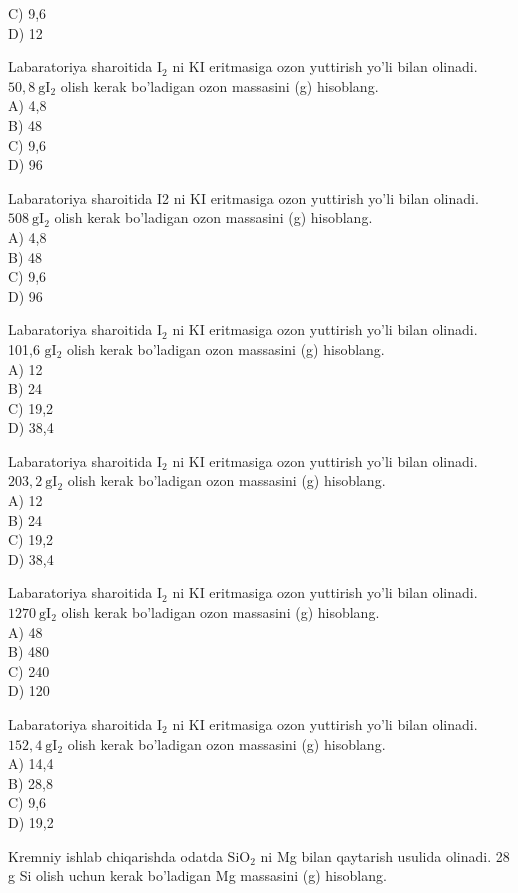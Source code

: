 C) 9,6\\
D) 12
  \item Labaratoriya sharoitida $\mathrm{I}_{2}$ ni KI eritmasiga ozon yuttirish yo'li bilan olinadi. $50,8 \mathrm{~g} \mathrm{I}_{2}$ olish kerak bo'ladigan ozon massasini (g) hisoblang.\\
A) 4,8\\
B) 48\\
C) 9,6\\
D) 96
  \item Labaratoriya sharoitida I2 ni KI eritmasiga ozon yuttirish yo'li bilan olinadi. $508 \mathrm{~g} \mathrm{I}_{2}$ olish kerak bo'ladigan ozon massasini (g) hisoblang.\\
A) 4,8\\
B) 48\\
C) 9,6\\
D) 96
  \item Labaratoriya sharoitida $\mathrm{I}_{2}$ ni KI eritmasiga ozon yuttirish yo'li bilan olinadi. 101,6 $\mathrm{g} \mathrm{I}_{2}$ olish kerak bo'ladigan ozon massasini (g) hisoblang.\\
A) 12\\
B) 24\\
C) 19,2\\
D) 38,4
  \item Labaratoriya sharoitida $\mathrm{I}_{2}$ ni KI eritmasiga ozon yuttirish yo'li bilan olinadi. $203,2 \mathrm{~g} \mathrm{I}_{2}$ olish kerak bo'ladigan ozon massasini (g) hisoblang.\\
A) 12\\
B) 24\\
C) 19,2\\
D) 38,4
  \item Labaratoriya sharoitida $\mathrm{I}_{2}$ ni KI eritmasiga ozon yuttirish yo'li bilan olinadi. $1270 \mathrm{~g} \mathrm{I}_{2}$ olish kerak bo'ladigan ozon massasini (g) hisoblang.\\
A) 48\\
B) 480\\
C) 240\\
D) 120
  \item Labaratoriya sharoitida $\mathrm{I}_{2}$ ni KI eritmasiga ozon yuttirish yo'li bilan olinadi. $152,4 \mathrm{~g} \mathrm{I}_{2}$ olish kerak bo'ladigan ozon massasini (g) hisoblang.\\
A) 14,4\\
B) 28,8\\
C) 9,6\\
D) 19,2
  \item Kremniy ishlab chiqarishda odatda $\mathrm{SiO}_{2}$ ni Mg bilan qaytarish usulida olinadi. 28 g Si olish uchun kerak bo'ladigan Mg massasini (g) hisoblang.\\
